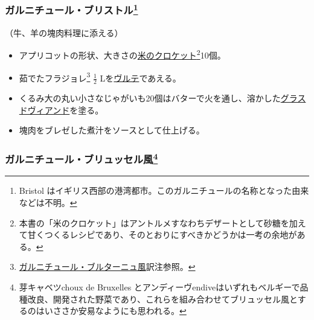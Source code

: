\begin{recette}
\hypertarget{garniture-bristol}{%
\subsubsection[ガルニチュール・ブリストル]{\texorpdfstring{ガルニチュール・ブリストル\footnote{Bristol
  はイギリス西部の港湾都市。このガルニチュールの名称となった由来などは不明。}}{ガルニチュール・ブリストル}}\label{garniture-bristol}}



（牛、羊の塊肉料理に添える）

\begin{itemize}
\item
  アプリコットの形状、大きさの\protect\hyperlink{croquettes-de-riz}{米のクロケット}\footnote{本書の「米のクロケット」はアントルメすなわちデザートとして砂糖を加えて甘くつくるレシピであり、そのとおりにすべきかどうかは一考の余地がある。}10個。
\item
  茹でたフラジョレ\footnote{\protect\hyperlink{garniture-bretonne}{ガルニチュール・ブルターニュ風}訳注参照。}
  \(\frac{1}{2}\) Lを\protect\hyperlink{veloute}{ヴルテ}であえる。
\item
  くるみ大の丸い小さなじゃがいも20個はバターで火を通し、溶かした\protect\hyperlink{glace-de-viande}{グラスドヴィアンド}を塗る。
\item
  塊肉をブレゼした煮汁をソースとして仕上げる。
\end{itemize}

\hypertarget{garniture-bluxelloise}{%
\subsubsection[ガルニチュール・ブリュッセル風]{\texorpdfstring{ガルニチュール・ブリュッセル風\footnote{芽キャベツchoux
  de Bruxelles
  とアンディーヴendiveはいずれもベルギーで品種改良、開発された野菜であり、これらを組み合わせてブリュッセル風とするのはいささか安易なようにも思われる。}}{ガルニチュール・ブリュッセル風}}\label{garniture-bluxelloise}}




\end{recette}
